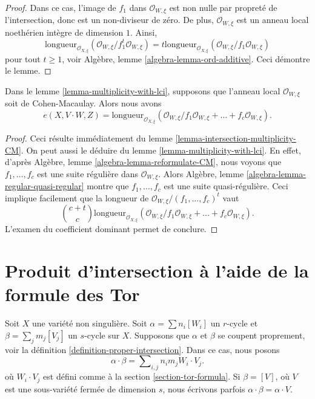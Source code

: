\begin{proof}
Dans ce cas, l'image de $f_1$ dans $\mathcal{O}_{W, \xi}$ est non nulle par
propreté de l'intersection, donc est un non-diviseur de zéro. De plus,
$\mathcal{O}_{W, \xi}$ est un anneau local noethérien intègre de dimension $1$.
Ainsi,
$$
\text{longueur}_{\mathcal{O}_{X, \xi}}
(\mathcal{O}_{W, \xi}/f_1^t\mathcal{O}_{W, \xi}) =
t \text{longueur}_{\mathcal{O}_{X, \xi}}
(\mathcal{O}_{W, \xi}/f_1\mathcal{O}_{W, \xi})
$$
pour tout $t \geq 1$, voir Algèbre, lemme \ref{algebra-lemma-ord-additive}.
Ceci démontre le lemme.
\end{proof}

\begin{lemma}
\label{lemma-multiplicity-lci-CM}
Dans le lemme \ref{lemma-multiplicity-with-lci}, supposons que
l'anneau local $\mathcal{O}_{W, \xi}$ soit de Cohen-Macaulay. Alors nous
avons
$$
e(X, V \cdot W, Z) =
\text{longueur}_{\mathcal{O}_{X, \xi}} (\mathcal{O}_{W, \xi}/
f_1\mathcal{O}_{W, \xi} + \ldots + f_c\mathcal{O}_{W, \xi}).
$$
\end{lemma}

\begin{proof}
Ceci résulte immédiatement du lemme \ref{lemma-intersection-multiplicity-CM}.
On peut aussi le déduire du lemme \ref{lemma-multiplicity-with-lci}.
En effet, d'après Algèbre, lemme \ref{algebra-lemma-reformulate-CM},
nous voyons que $f_1, \ldots, f_c$ est une suite régulière dans
$\mathcal{O}_{W, \xi}$. Alors
Algèbre, lemme \ref{algebra-lemma-regular-quasi-regular} montre que
$f_1, \ldots, f_c$ est une suite quasi-régulière.
Ceci implique facilement que la longueur de
$\mathcal{O}_{W, \xi}/(f_1, \ldots, f_c)^t$ vaut
$$
{c + t \choose c}
\text{longueur}_{\mathcal{O}_{X, \xi}} (\mathcal{O}_{W, \xi}/
f_1\mathcal{O}_{W, \xi} + \ldots + f_c\mathcal{O}_{W, \xi}).
$$
L'examen du coefficient dominant permet de conclure.
\end{proof}


\section{Produit d'intersection à l'aide de la formule des Tor}
\label{section-intersection-product}

\noindent
Soit $X$ une variété non singulière. Soit
$\alpha = \sum n_i [W_i]$ un $r$-cycle et
$\beta = \sum_j m_j [V_j]$ un $s$-cycle sur $X$.
Supposons que $\alpha$ et $\beta$ se coupent proprement, voir
la définition \ref{definition-proper-intersection}.
Dans ce cas, nous posons
$$
\alpha \cdot \beta = \sum\nolimits_{i,j} n_i m_j W_i \cdot V_j.
$$
où $W_i \cdot V_j$ est défini comme à la section \ref{section-tor-formula}.
Si $\beta = [V]$, où $V$ est une sous-variété fermée de dimension $s$,
nous écrivons parfois $\alpha \cdot \beta = \alpha \cdot V$.

